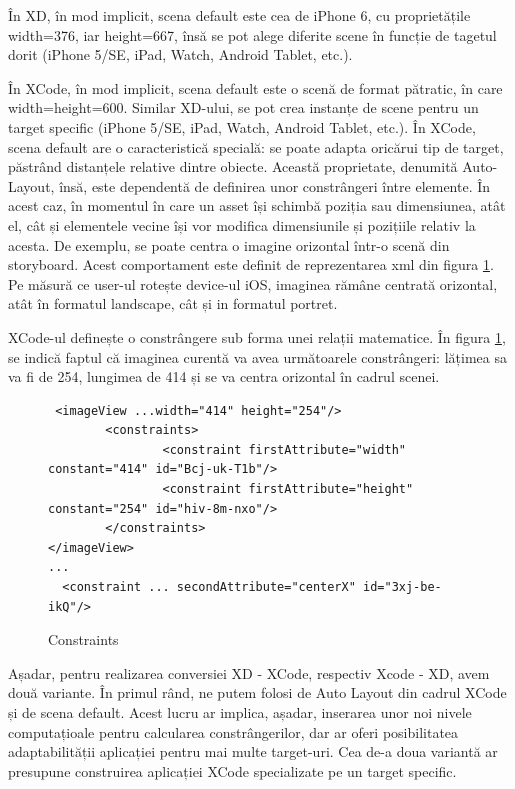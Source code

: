 În XD, în mod implicit, scena default este cea de iPhone 6, cu proprietățile width=376, iar height=667, însă se pot alege diferite scene în funcție de tagetul dorit (iPhone 5/SE, iPad, Watch, Android Tablet, etc.). 

În XCode, în mod implicit, scena default este o scenă de format pătratic, în care width=height=600. Similar XD-ului, se pot crea instanțe de scene pentru un target specific (iPhone 5/SE, iPad, Watch, Android Tablet, etc.). În XCode, scena default are o caracteristică specială: se poate adapta oricărui tip de target, păstrând distanțele relative dintre obiecte. Această proprietate, denumită Auto-Layout, însă, este dependentă de definirea unor constrângeri între elemente. În acest caz, în momentul în care un asset își schimbă poziția sau dimensiunea, atât el, cât și elementele vecine își vor modifica dimensiunile și pozițiile relativ la acesta. De exemplu, se poate centra o imagine orizontal într-o scenă din storyboard. Acest comportament este definit de reprezentarea xml din figura \ref{fig:Constraints}. Pe măsură ce user-ul rotește device-ul iOS, imaginea rămâne centrată orizontal, atât în formatul landscape, cât și in formatul portret.

XCode-ul definește o constrângere sub forma unei relații matematice. În figura \ref{fig:Constraints}, se indică faptul că imaginea curentă va avea următoarele constrângeri: lățimea sa va fi de 254, lungimea de 414 și se va centra orizontal în cadrul scenei.  

\begin{figure}[!htbp]
\lstset{language=XML}
\begin{lstlisting}
 <imageView ...width="414" height="254"/>
        <constraints>
                <constraint firstAttribute="width" constant="414" id="Bcj-uk-T1b"/>
                <constraint firstAttribute="height" constant="254" id="hiv-8m-nxo"/>
        </constraints>
</imageView>
...
  <constraint ... secondAttribute="centerX" id="3xj-be-ikQ"/>
\end{lstlisting}
\caption{Constraints} \label{fig:Constraints}
\end{figure}

Așadar, pentru realizarea conversiei XD - XCode, respectiv Xcode - XD, avem două variante.
În primul rând, ne putem folosi de Auto Layout din cadrul XCode și de scena default. Acest lucru ar implica, așadar, inserarea unor noi nivele computațioale pentru calcularea constrângerilor, dar ar oferi posibilitatea adaptabilității aplicației pentru mai multe target-uri.
Cea de-a doua variantă ar presupune construirea aplicației XCode specializate pe un target specific. 

